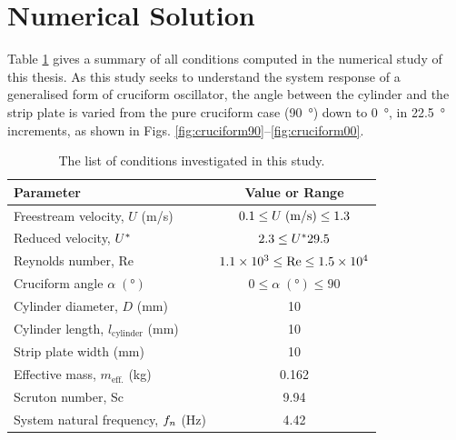 \documentclass[oneside]{utmthesis}
\begin{document}
\section{Numerical Solution} \label{sec:numericalSolution}

Table \ref{tab:researchMatrix} gives a summary of all conditions computed in the numerical study of this thesis. As this study seeks to understand the system response of a generalised form of cruciform oscillator, the angle between the cylinder and the strip plate is varied from the pure cruciform case (\SI{90}{\degree}) down to \SI{0}{\degree}, in \SI{22.5}{\degree} increments, as shown in Figs. \ref{fig:cruciform90}--\ref{fig:cruciform00}.

\begin{table}[!ht]
\centering
\caption{The list of conditions investigated in this study.} \label{tab:researchMatrix}
\vspace{\baselineskip}
\setlength{\tabcolsep}{10pt}      %
\renewcommand{\arraystretch}{1.5} %
\begin{tabular}{l c}
  \hline
  \hline
  Parameter                                  & Value or Range                                                     \\
  \hline
  Freestream velocity, $U$ (m/s)             & $0.1 \leq U \; (\si[per-mode=symbol]{\metre\per\second}) \leq 1.3$ \\
  Reduced velocity, $U^{*}$                  & $2.3 \leq U^{*} 29.5$                                              \\
  Reynolds number, Re                        & $1.1 \times 10^{3} \leq \text{Re} \leq 1.5 \times 10^{4}$                \\
  Cruciform angle $\alpha \; (\si{\degree})$ & $0 \leq \alpha \; (\si{\degree}) \leq 90$                          \\
  Cylinder diameter, $D$ (mm)                 & 10                                                                 \\
  Cylinder length, $l_{\text{cylinder}}$ (mm) & 10                                                                 \\
  Strip plate width (mm)                     & 10                                                                 \\
  Effective mass, $m_{\text{eff.}}$ (kg)     & 0.162                                                              \\
  Scruton number, Sc                         & 9.94                                                               \\
  System natural frequency, $f_{n}$ (Hz)       & 4.42                                                               \\
  \hline
  \hline
\end{tabular}
\end{table}
\end{document}
